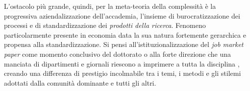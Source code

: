 \documentclass[a4paper, headings=standardclasses]{scrartcl}
\begin{document}
L'ostacolo più grande, quindi, per la meta-teoria della complessità è la progressiva aziendalizzazione dell'accademia, l'insieme di burocratizzazione dei processi e di standardizzazione dei \textit{prodotti della ricerca}. 
Fenomeno particolarmente presente in economia data la sua natura fortemente gerarchica e propensa alla standardizzazione. Si pensi all'istituzionalizzazione del \textit{job market paper} come momento conclusivo del dottorato o alla forte direzione che una manciata di dipartimenti e giornali riescono a imprimere a tutta la disciplina \parencite{heckman2020, aistleitner2023}, creando una differenza di prestigio incolmabile tra i temi, i metodi e gli stilemi adottati dalla comunità dominante e tutti gli altri.

\begin{refcontext}[sorting=nyt]
	\printbibliography
\end{refcontext}
\end{document}
